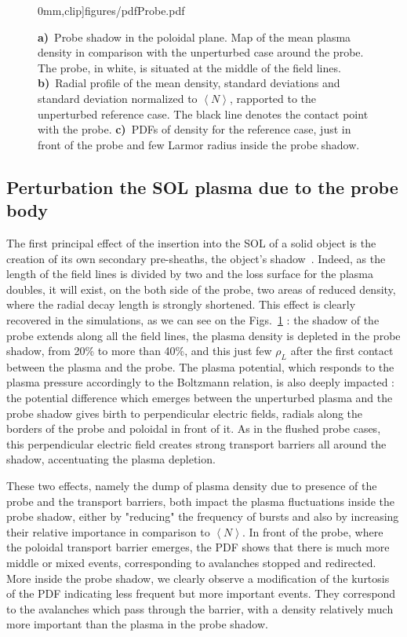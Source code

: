 \documentclass[cpp,a4paper,fleqn,twoside%
]{w-art}
\begin{document}
\begin{figure}
\begin{minipage}{52mm}
0mm,clip]{figures/pdfProbe.pdf}
\end{minipage}
\begin{minipage}{\linewidth}
\caption{\textbf{a)}~Probe shadow in the poloidal plane. Map of the 
mean plasma density in comparison with the unperturbed 
case around the probe. The probe, in white, is situated at the middle of the field 
lines.
\textbf{b)}~Radial profile of the mean density, standard deviations and 
standard deviation normalized to $\left<N\right>$, rapported to the 
unperturbed reference case. The black line denotes the contact point 
with the probe.
\textbf{c)}~PDFs of density for the reference case, just in front of 
the probe and few Larmor radius inside the probe shadow.}
 \label{fig:5}
  \end{minipage}
\end{figure}
\subsection{\bf Perturbation the SOL plasma due to the probe body}

The first principal effect of the insertion into the SOL of a solid 
object is the creation of its own secondary pre-sheaths, the object's 
shadow~\cite{Hutchinson91}. Indeed, as the length of the field 
lines is divided by two and the loss surface for the plasma doubles, it will 
exist, on the both side of the probe, two areas of reduced density, 
where the radial decay length is strongly shortened. 
This effect is clearly recovered in the simulations, as we can see on 
the Figs.~\ref{fig:5} : the shadow of the probe extends along all the 
field lines, the plasma density is depleted in the probe shadow, 
from 20\% to more than 40\%, and this just few $\rho_L$ after the first contact between the 
plasma and the probe. 
The plasma potential, which responds to the plasma pressure accordingly 
to the Boltzmann relation, is also deeply impacted : the potential 
difference which emerges between the unperturbed plasma and the 
probe shadow gives birth to perpendicular electric fields, radials along 
 the borders of the probe and poloidal in front of it. As in the 
 flushed probe cases, this perpendicular electric field creates 
strong transport barriers all around the shadow, accentuating the 
plasma depletion.

These two effects, namely the dump of plasma density due to presence 
of the probe and the transport barriers, both impact the plasma 
fluctuations inside the probe shadow, either by "reducing" the 
frequency of bursts and also by increasing their relative importance in 
comparison to $\left<N\right>$. In front of the probe, where the 
poloidal transport barrier emerges, the PDF shows that there is much 
more middle or mixed events, corresponding to avalanches stopped and 
redirected. More inside the probe shadow, we clearly observe a 
modification of the kurtosis of the PDF indicating less frequent but 
more important events. They correspond to the avalanches which pass 
through the barrier, with a density relatively much more important than 
the plasma in the probe shadow.
\end{document}
